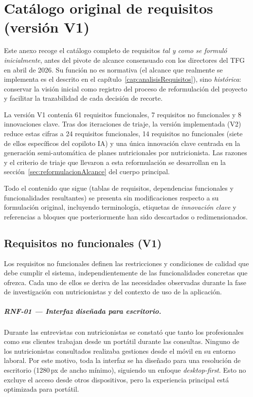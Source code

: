\chapter{Catálogo original de requisitos (versión V1)}
\label{apendice:catalogoV1}

Este anexo recoge el catálogo completo de requisitos \emph{tal y como se formuló inicialmente}, antes del pivote de alcance consensuado con los directores del TFG en abril de 2026. Su función no es normativa (el alcance que realmente se implementa es el descrito en el capítulo~\ref{cap:analisisRequisitos}), sino \emph{histórica}: conservar la visión inicial como registro del proceso de reformulación del proyecto y facilitar la trazabilidad de cada decisión de recorte.

La versión V1 contenía 61 requisitos funcionales, 7 requisitos no funcionales y 8 innovaciones clave. Tras dos iteraciones de triaje, la versión implementada (V2) reduce estas cifras a 24 requisitos funcionales, 14 requisitos no funcionales (siete de ellos específicos del copiloto IA) y una única innovación clave centrada en la generación semi-automática de planes nutricionales por nutricionista. Las razones y el criterio de triaje que llevaron a esta reformulación se desarrollan en la sección~\ref{sec:reformulacionAlcance} del cuerpo principal.

Todo el contenido que sigue (tablas de requisitos, dependencias funcionales y funcionalidades resultantes) se presenta sin modificaciones respecto a su formulación original, incluyendo terminología, etiquetas de \emph{innovación clave} y referencias a bloques que posteriormente han sido descartados o redimensionados.

\section{Requisitos no funcionales (V1)}
\label{sec:rnf-v1}

Los requisitos no funcionales definen las restricciones y condiciones de calidad que debe cumplir el sistema, independientemente de las funcionalidades concretas que ofrezca. Cada uno de ellos se deriva de las necesidades observadas durante la fase de investigación con nutricionistas y del contexto de uso de la aplicación.

\paragraph{RNF-01 --- Interfaz diseñada para escritorio.}
Durante las entrevistas con nutricionistas se constató que tanto los profesionales como sus clientes trabajan desde un portátil durante las consultas. Ninguno de los nutricionistas consultados realizaba gestiones desde el móvil en su entorno laboral. Por este motivo, toda la interfaz se ha diseñado para una resolución de escritorio (1280\,px de ancho mínimo), siguiendo un enfoque \textit{desktop-first}. Esto no excluye el acceso desde otros dispositivos, pero la experiencia principal está optimizada para portátil.

